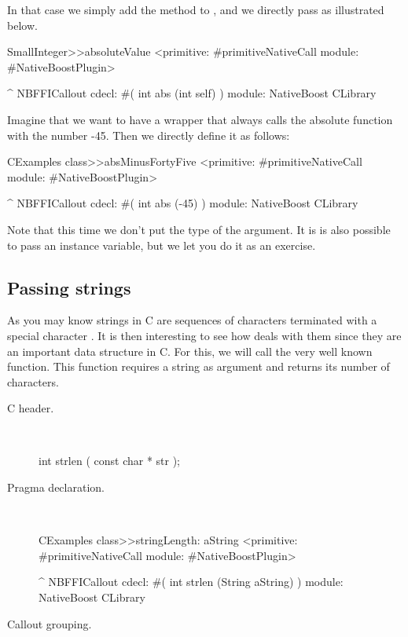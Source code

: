 \documentclass[a4paper,10pt,twoside]{book}
\begin{document}
In that case we simply add the  method to , and we directly pass  as illustrated below.

\begin{code}{}
SmallInteger>>absoluteValue
	<primitive: #primitiveNativeCall module: #NativeBoostPlugin>
	
	^ NBFFICallout cdecl: #( int abs (int self) ) module: NativeBoost CLibrary
\end{code}

Imagine that we want to have a wrapper that always calls the absolute function with the number -45. Then we directly define it as follows:

\begin{code}{}
CExamples class>>absMinusFortyFive
	<primitive: #primitiveNativeCall module: #NativeBoostPlugin>
	
	^ NBFFICallout cdecl: #( int abs (-45) ) module: NativeBoost CLibrary
\end{code}

Note that this time we don't put the type of the argument. It is is also possible to pass an instance variable, but we let you do it as an exercise.

\subsection{Passing strings}
As you may know strings in C are sequences of characters terminated with a special character \ct{\0}. It is then interesting to see how \Spock deals with them since they are an important data structure in C. For this, we will call the very well known  function. This function requires a string as argument and returns its
number of characters. 


\begin{description}
\item [C header.] \ 

\begin{code}{}
int strlen ( const char * str );
\end{code}

\item [Pragma declaration.] \ 

\begin{code}{}
CExamples class>>stringLength: aString
	<primitive: #primitiveNativeCall module: #NativeBoostPlugin>
	
	^ NBFFICallout cdecl: #( int strlen (String aString) ) module: NativeBoost CLibrary
\end{code}


\item [Callout grouping.] \ 
 
\end{description}
\end{document}

